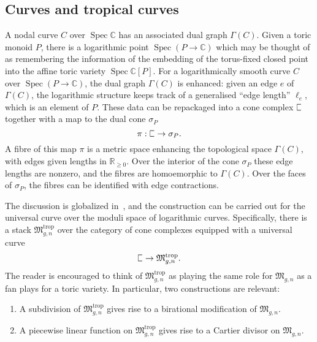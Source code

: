 \documentclass[11pt]{amsart}
\newcommand{\plC}{\scalebox{0.8}[1.3]{$\sqsubset$}}
\renewcommand{\to}{\rightarrow}
\newcommand{\CC}{\mathbb{C}}
\newcommand{\RR}{\mathbb{R}}
\DeclareMathOperator{\spec}{Spec}
\theoremstyle{definition}
\theoremstyle{definition}
\begin{document}
\subsection{Curves and tropical curves} A nodal curve $C$ over $\spec \mathbb C$ has an associated dual graph $\Gamma(C)$. Given a toric monoid $P$, there is a logarithmic point $\spec (P \to \CC)$ which may be thought of as remembering the information of the embedding of the torus-fixed closed point into the affine toric variety $\spec \mathbb C[P]$. For a logarithmically smooth curve $C$ over $\spec (P \to \CC)$, the dual graph $\Gamma(C)$ is enhanced: given an edge $e$ of $\Gamma(C)$, the logarithmic structure keeps track of a generalised ``edge length'' $\ell_e$, which is an element of $P$. These data can be repackaged into a cone complex $\plC$ together with a map to the dual cone $\sigma_P$
\[
\pi: \plC\to \sigma_P.
\]
A fibre of this map $\pi$ is a metric space enhancing the topological space $\Gamma(C)$, with edges given lengths in $\RR_{\geq 0}$. Over the interior of the cone $\sigma_P$ these edge lengths are nonzero, and the fibres are homoemorphic to $\Gamma(C)$. Over the faces of $\sigma_P$, the fibres can be identified with edge contractions. 

The discussion is globalized in~\cite{CavalieriChanUlirschWise}, and the construction can be carried out for the universal curve over the moduli space of logarithmic curves. Specifically, there is a stack $\mathfrak M_{g,n}^{\mathrm{trop}}$ over the category of cone complexes equipped with a universal curve 
\[
\plC\to \mathfrak M_{g,n}^{\mathrm{trop}}.
\]
The reader is encouraged to think of $\mathfrak M_{g,n}^{\mathrm{trop}}$ as playing the same role for $\mathfrak M_{g,n}$ as a fan plays for a toric variety. In particular, two constructions are relevant:
\begin{enumerate}
\item A subdivision of $\mathfrak M_{g,n}^{\mathrm{trop}}$ gives rise to a birational modification of $\mathfrak M_{g,n}$.
\item A piecewise linear function on $\mathfrak M_{g,n}^{\mathrm{trop}}$ gives rise to a Cartier divisor on $\mathfrak M_{g,n}$.
\end{enumerate}
\end{document}
